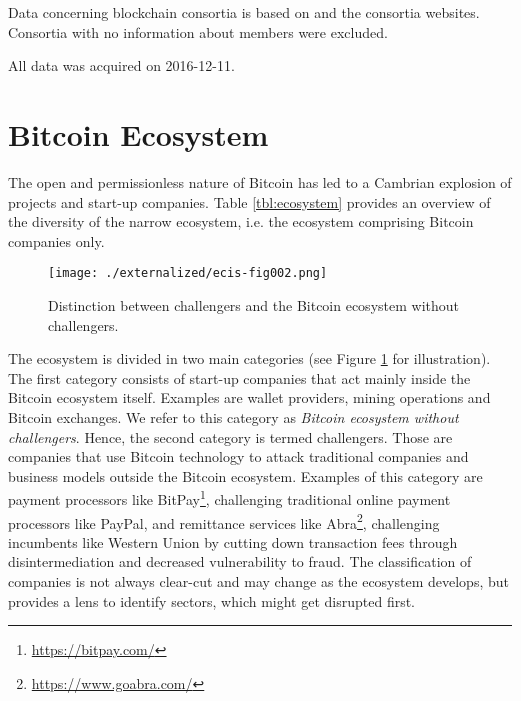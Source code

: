Data concerning blockchain consortia is based on \parencite{Mougayar2016} and the consortia websites. Consortia with no information about members were excluded.

All data was acquired on 2016-12-11.

\section{Bitcoin Ecosystem}

\label{sec:sec:eco}

The open and permissionless nature of Bitcoin has led to a Cambrian explosion of 
projects and start-up companies. Table \ref{tbl:ecosystem} provides an overview of the diversity 
of the narrow ecosystem, i.e. the ecosystem comprising Bitcoin companies only. 

\begin{figure}[htbp]
\centering
\texttt{[image: ./externalized/ecis-fig002.png]}
\caption{Distinction between challengers and the Bitcoin ecosystem without 
challengers.}
\label{fig:challengers}
\end{figure}

The ecosystem is divided in two main categories (see Figure \ref{fig:challengers} for illustration). 
The first category consists of start-up companies that act mainly inside the Bitcoin 
ecosystem itself. Examples are wallet providers, mining operations and Bitcoin 
exchanges. We refer to this category as \emph{Bitcoin ecosystem without challengers}. 
Hence, the second category is termed challengers. Those are companies that use 
Bitcoin technology to attack traditional companies and business models outside 
the Bitcoin ecosystem. Examples of this category are payment processors like BitPay\footnote{\url{https://bitpay.com/}}, challenging traditional online payment processors like PayPal, and remittance 
services like Abra\footnote{\url{https://www.goabra.com/}}, challenging incumbents like Western Union by cutting 
down transaction fees through disintermediation and decreased vulnerability to 
fraud. The classification of companies is not always clear-cut and may change as 
the ecosystem develops, but provides a lens to identify sectors, which might get 
disrupted first.

